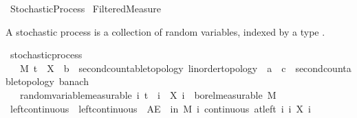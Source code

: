 %
\begin{isabellebody}%
%
%
\isadelimtheory
%
\endisadelimtheory
%
\isatagtheory
{}\isamarkupfalse%
\ Stochastic{\isacharunderscore}{\kern0pt}Process\isanewline
{}\ Filtered{\isacharunderscore}{\kern0pt}Measure\isanewline
{}%
\endisatagtheory
{\isafoldtheory}%
%
\isadelimtheory
%
\endisadelimtheory
%
\isadelimdocument
%
\endisadelimdocument
%
\isatagdocument
%
\isamarkuptrue%
%
\endisatagdocument
{\isafolddocument}%
%
\isadelimdocument
%
\endisadelimdocument
%
\begin{isamarkuptext}%
A stochastic process is a collection of random variables, indexed by a type .%
\end{isamarkuptext}\isamarkuptrue%
\isamarkupfalse%
\ stochastic{\isacharunderscore}{\kern0pt}process\ {\isacharequal}{\kern0pt}\isanewline
\ \ \ M\ t\ \ X\ {\isacharcolon}{\kern0pt}{\isacharcolon}{\kern0pt}\ {\isachardoublequoteopen}{\isacharprime}{\kern0pt}b\ {\isacharcolon}{\kern0pt}{\isacharcolon}{\kern0pt}\ {\isacharbraceleft}{\kern0pt}second{\isacharunderscore}{\kern0pt}countable{\isacharunderscore}{\kern0pt}topology{\isacharcomma}{\kern0pt}\ linorder{\isacharunderscore}{\kern0pt}topology{\isacharbraceright}{\kern0pt}\ {\isasymRightarrow}\ {\isacharprime}{\kern0pt}a\ {\isasymRightarrow}\ {\isacharprime}{\kern0pt}c\ {\isacharcolon}{\kern0pt}{\isacharcolon}{\kern0pt}\ {\isacharbraceleft}{\kern0pt}second{\isacharunderscore}{\kern0pt}countable{\isacharunderscore}{\kern0pt}topology{\isacharcomma}{\kern0pt}\ banach{\isacharbraceright}{\kern0pt}{\isachardoublequoteclose}\isanewline
\ \ \ random{\isacharunderscore}{\kern0pt}variable{\isacharbrackleft}{\kern0pt}measurable{\isacharbrackright}{\kern0pt}{\isacharcolon}{\kern0pt}\ {\isachardoublequoteopen}{\isasymAnd}i{\isachardot}{\kern0pt}\ t\ {\isasymle}\ i\ {\isasymLongrightarrow}\ X\ i\ {\isasymin}\ borel{\isacharunderscore}{\kern0pt}measurable\ M{\isachardoublequoteclose}\isanewline
{}\isanewline
\isanewline
{}\isamarkupfalse%
\ left{\isacharunderscore}{\kern0pt}continuous\ \ {\isachardoublequoteopen}left{\isacharunderscore}{\kern0pt}continuous\ {\isacharequal}{\kern0pt}\ {\isacharparenleft}{\kern0pt}AE\ {\isasymxi}\ in\ M{\isachardot}{\kern0pt}\ {\isasymforall}i{\isachardot}{\kern0pt}\ continuous\ {\isacharparenleft}{\kern0pt}at{\isacharunderscore}{\kern0pt}left\ i{\isacharparenright}{\kern0pt}\ {\isacharparenleft}{\kern0pt}{\isasymlambda}i{\isachardot}{\kern0pt}\ X\ i\ {\isasymxi}{\isacharparenright}{\kern0pt}{\isacharparenright}{\kern0pt}{\isachardoublequoteclose}\isanewline

\end{isabellebody}

